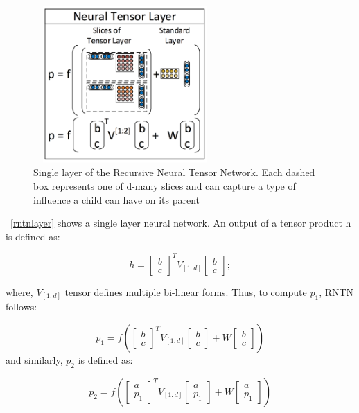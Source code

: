\begin{figure}[ht!]
	\centering
		\includegraphics[height=60mm,  width=70mm]{figures/5_rntnmodel.png}
		\caption[Recursive Neural Tensor Network Layer]{Single layer of the Recursive Neural Tensor Network. Each dashed box represents one of d-many slices and can capture a type of influence a child can have on its parent}
			\label{rntnlayer}
\end{figure}
~\autoref{rntnlayer} shows a single layer neural network. An output of a tensor product h is defined as:

\begin{equation}
h =  {\begin{bmatrix}b \\c \end{bmatrix}}^{T} {V}_{[1:d]} \begin{bmatrix}b \\c \end{bmatrix};
\end{equation}

where, ${V}_{[1:d]}$ tensor defines multiple bi-linear forms.
Thus, to compute ${p}_{1}$, RNTN follows:


\begin{equation}
{p}_{1} = f ({\begin{bmatrix}b \\c \end{bmatrix}}^{T} {V}_{[1:d]} \begin{bmatrix}b \\c \end{bmatrix} + W \begin{bmatrix}b \\c \end{bmatrix})
\end{equation}
and similarly, ${p}_{2}$ is defined as:

\begin{equation}
{p}_{2} = f ({\begin{bmatrix}a \\{p}_{1} \end{bmatrix}}^{T} {V}_{[1:d]} \begin{bmatrix}a \\{p}_{1} \end{bmatrix} + W \begin{bmatrix}a \\{p}_{1} \end{bmatrix})
\end{equation}

